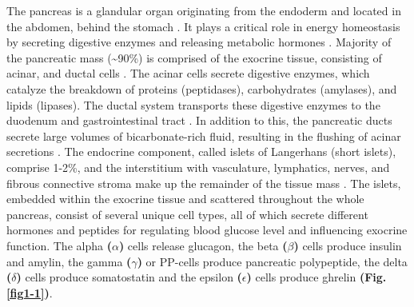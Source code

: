 The pancreas is a glandular organ originating from the endoderm and located in the abdomen, behind the stomach \textbf{\cite{shih_pancreas_2013}}. It plays a %
critical role 
in energy homeostasis
by secreting digestive enzymes and releasing metabolic hormones \textbf{\cite{kimmel_molecular_2010, baron_single-cell_2016}}. %
Majority of the pancreatic mass (\textasciitilde 90\%) is comprised of the exocrine tissue, consisting of acinar, 
and ductal cells \textbf{\cite{pandiri_overview_2014}}. The acinar cells secrete digestive enzymes, which catalyze the breakdown of proteins (peptidases), carbohydrates (amylases), and lipids (lipases). The ductal system transports these digestive enzymes to the duodenum and gastrointestinal tract \textbf{\cite{shih_pancreas_2013, baron_single-cell_2016}}.  In addition to this, the 
pancreatic ducts %
secrete large volumes of bicarbonate-rich fluid, resulting in the flushing of acinar secretions \textbf{\cite{pandiri_overview_2014, low_pancreatic_2010}}. The endocrine component, called islets of Langerhans (short islets), comprise 1-2\%, and the interstitium with vasculature, lymphatics, nerves, and fibrous connective stroma make up the remainder of the tissue mass \textbf{\cite{pandiri_overview_2014}}. %
The islets, embedded within the exocrine tissue and scattered throughout the whole pancreas, consist of several unique cell types, all of which secrete different hormones and peptides for regulating %
blood glucose level \textbf{\cite{shih_pancreas_2013, baron_single-cell_2016}} and influencing exocrine function. The alpha \textbf{($\alpha$)} cells release glucagon, the beta \textbf{($\beta$)} cells produce insulin and amylin, the gamma \textbf{($\gamma$)} or PP-cells produce pancreatic polypeptide, the delta \textbf{($\delta$)} cells produce somatostatin and the epsilon \textbf{($\epsilon$)} cells produce ghrelin \textbf{\cite{mastracci_endocrine_2012} (Fig.\ref{fig1-1})}.\\

